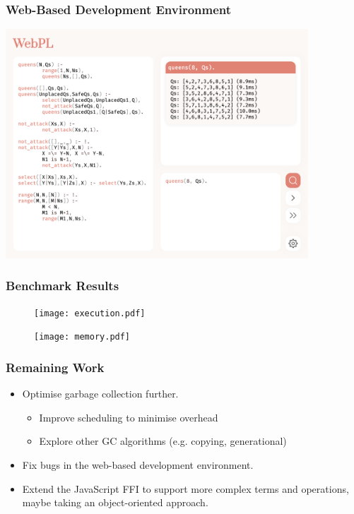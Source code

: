 \documentclass{beamer}
\begin{document}
\begin{frame}
\frametitle{Web-Based Development Environment}

\begin{center}
\includegraphics[width=0.85\textwidth]{browser.png}
\end{center}

\end{frame}

\begin{frame}
\frametitle{Benchmark Results}

\begin{figure}[h]
\centering
\begin{minipage}{0.45\textwidth}
  \centering
  \texttt{[image: execution.pdf]}
\end{minipage}
\hfill
\begin{minipage}{0.45\textwidth}
  \centering
  \texttt{[image: memory.pdf]}
\end{minipage}
\end{figure}

\end{frame}

\begin{frame}
\frametitle{Remaining Work}

\begin{itemize}
\item Optimise garbage collection further.
\begin{itemize}
\item Improve scheduling to minimise overhead
\item Explore other GC algorithms (e.g. copying, generational)
\end{itemize}
\item Fix bugs in the web-based development environment.
\item Extend the JavaScript FFI to support more complex terms and operations, maybe taking an object-oriented approach.
\end{itemize}


\end{frame}
\end{document}

